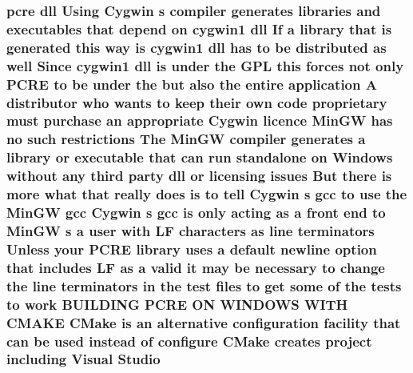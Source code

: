 \subsubsection[{\texorpdfstring{Studio}{Studio}}]{ {\bf pcre} dll Using Cygwin {\bf s} {\bf compiler} generates {\bf libraries} and executables that depend {\bf on} cygwin1 dll If {\bf a} {\bf library} that {\bf is} {\bf generated} {\bf this} {\bf way} {\bf is} cygwin1 dll has {\bf to} {\bf be} {\bf distributed} {\bf as} well Since cygwin1 dll {\bf is} under the {\bf G\+PL} {\bf this} forces {\bf not} only {\bf P\+C\+RE} {\bf to} {\bf be} under the but also the entire application {\bf A} distributor who wants {\bf to} keep their own {\bf code} proprietary must purchase an appropriate Cygwin {\bf licence} {\bf Min\+GW} has no such restrictions The {\bf Min\+GW} {\bf compiler} generates {\bf a} {\bf library} {\bf or} executable that {\bf can} {\bf run} standalone {\bf on} {\bf Windows} without {\bf any} third party dll {\bf or} licensing issues But there {\bf is} more {\bf what} that really does {\bf is} {\bf to} tell Cygwin {\bf s} {\bf gcc} {\bf to} use the {\bf Min\+GW} {\bf gcc} Cygwin {\bf s} {\bf gcc} {\bf is} only acting {\bf as} {\bf a} front {\bf end} {\bf to} {\bf Min\+GW} {\bf s} {\bf a} user {\bf with} {\bf LF} {\bf characters} {\bf as} {\bf line} terminators Unless your {\bf P\+C\+RE} {\bf library} uses {\bf a} {\bf default} {\bf newline} {\bf option} that includes {\bf LF} {\bf as} {\bf a} valid {\bf it} may {\bf be} necessary {\bf to} change the {\bf line} terminators {\bf in} the test {\bf files} {\bf to} get some {\bf of} the {\bf tests} {\bf to} work B\+U\+I\+L\+D\+I\+NG {\bf P\+C\+RE} ON W\+I\+N\+D\+O\+WS W\+I\+TH C\+M\+A\+KE C\+Make {\bf is} an alternative configuration {\bf facility} that {\bf can} {\bf be} {\bf used} instead {\bf of} {\bf configure} C\+Make creates {\bf project} including Visual Studio}\hypertarget{NON-AUTOTOOLS-BUILD_8txt_a694346029765b41fddf1acfb41fae7c3}{}\label{NON-AUTOTOOLS-BUILD_8txt_a694346029765b41fddf1acfb41fae7c3}
